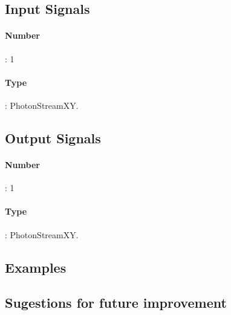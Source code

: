 \subsection*{Input Signals}
\paragraph*{Number}: 1
\paragraph*{Type}: PhotonStreamXY.

\subsection*{Output Signals}
\paragraph*{Number}: 1
\paragraph*{Type}: PhotonStreamXY.

\subsection*{Examples}


\subsection*{Sugestions for future improvement}



